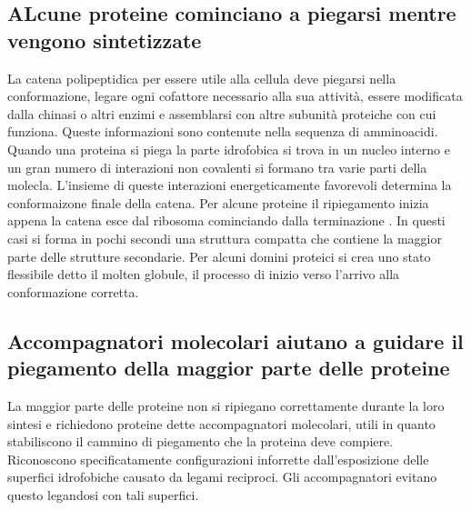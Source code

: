 \subsection{ALcune proteine cominciano a piegarsi mentre vengono sintetizzate}
La catena polipeptidica per essere utile alla cellula deve piegarsi nella conformazione, legare ogni cofattore necessario alla sua attivit\`a, essere modificata dalla chinasi o altri 
enzimi e assemblarsi con altre subunit\`a proteiche con cui funziona. Queste informazioni sono contenute nella sequenza di amminoacidi. Quando una proteina si piega la parte idrofobica
si trova in un nucleo interno e un gran numero di interazioni non covalenti si formano tra varie parti della molecla. L'insieme di queste interazioni energeticamente favorevoli determina
la conformaizone finale della catena. Per alcune proteine il ripiegamento inizia appena la catena esce dal ribosoma cominciando dalla terminazione . In questi casi si forma in 
pochi secondi una struttura compatta che contiene la maggior parte delle strutture secondarie. Per alcuni domini proteici si crea uno stato flessibile detto il molten globule, il 
processo di inizio verso l'arrivo alla conformazione corretta. 
\subsection{Accompagnatori molecolari aiutano a guidare il piegamento della maggior parte delle proteine}
La maggior parte delle proteine non si ripiegano correttamente durante la loro sintesi e richiedono proteine dette accompagnatori molecolari, utili in quanto stabiliscono il cammino
di piegamento che la proteina deve compiere. Riconoscono specificatamente configurazioni inforrette dall'esposizione delle superfici idrofobiche causato da legami reciproci. Gli 
accompagnatori evitano questo legandosi con tali superfici.
